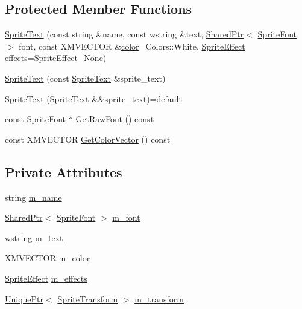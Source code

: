 \subsection*{Protected Member Functions}
\begin{DoxyCompactItemize}
\item 
\hyperlink{classmage_1_1_sprite_text_a1ff744c619c2d70758287da76b98ca9a}{Sprite\+Text} (const string \&name, const wstring \&text, \hyperlink{namespacemage_a1e01ae66713838a7a67d30e44c67703e}{Shared\+Ptr}$<$ \hyperlink{classmage_1_1_sprite_font}{Sprite\+Font} $>$ font, const X\+M\+V\+E\+C\+T\+OR \&\hyperlink{namespacemage_a56eceea5a9bceb2b56073f3ea4945781}{color}=Colors\+::\+White, \hyperlink{namespacemage_a9cfe18123066ba4236f548f9de75d881}{Sprite\+Effect} effects=\hyperlink{namespacemage_a9cfe18123066ba4236f548f9de75d881af3c275fbfacfe174da928b2f24dfa515}{Sprite\+Effect\+\_\+\+None})
\item 
\hyperlink{classmage_1_1_sprite_text_a3e56a7882dd714a6d8f2452d4f7071ff}{Sprite\+Text} (const \hyperlink{classmage_1_1_sprite_text}{Sprite\+Text} \&sprite\+\_\+text)
\item 
\hyperlink{classmage_1_1_sprite_text_ab569dfa4ff5a30f0a23005c43635aad7}{Sprite\+Text} (\hyperlink{classmage_1_1_sprite_text}{Sprite\+Text} \&\&sprite\+\_\+text)=default
\item 
const \hyperlink{classmage_1_1_sprite_font}{Sprite\+Font} $\ast$ \hyperlink{classmage_1_1_sprite_text_ab67ba17af1b19766343d04f10853c8d6}{Get\+Raw\+Font} () const
\item 
const X\+M\+V\+E\+C\+T\+OR \hyperlink{classmage_1_1_sprite_text_af1132df7faed07b44ae6415ae51b6318}{Get\+Color\+Vector} () const
\end{DoxyCompactItemize}
\subsection*{Private Attributes}
\begin{DoxyCompactItemize}
\item 
string \hyperlink{classmage_1_1_sprite_text_a2c4cde370b6785d970c2d3ef127dda87}{m\+\_\+name}
\item 
\hyperlink{namespacemage_a1e01ae66713838a7a67d30e44c67703e}{Shared\+Ptr}$<$ \hyperlink{classmage_1_1_sprite_font}{Sprite\+Font} $>$ \hyperlink{classmage_1_1_sprite_text_a922e37fbcbc431e815ebabe82e4528b0}{m\+\_\+font}
\item 
wstring \hyperlink{classmage_1_1_sprite_text_a807d5dc467ef16f6c83762dfe6ad3391}{m\+\_\+text}
\item 
X\+M\+V\+E\+C\+T\+OR \hyperlink{classmage_1_1_sprite_text_a200b59aae72c02fda55fafc8e147987a}{m\+\_\+color}
\item 
\hyperlink{namespacemage_a9cfe18123066ba4236f548f9de75d881}{Sprite\+Effect} \hyperlink{classmage_1_1_sprite_text_a5fdeb8c2f30482e2c89d892aeb43c50b}{m\+\_\+effects}
\item 
\hyperlink{namespacemage_a8c307fbcc33bce9b7f2aa4c26c3b95cf}{Unique\+Ptr}$<$ \hyperlink{structmage_1_1_sprite_transform}{Sprite\+Transform} $>$ \hyperlink{classmage_1_1_sprite_text_a2b8441454a3811e6a1869d999c4d2063}{m\+\_\+transform}
\end{DoxyCompactItemize}


